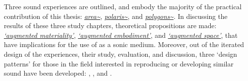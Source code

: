 \begin{SingleSpace}
    Three sound  experiences are outlined, and embody the majority of the practical contribution of this thesis: \textit{\hyperref[sec: area]{area\textasciitilde{}}}, \textit{\hyperref[sec: polaris]{polaris\textasciitilde{}}}, and \textit{\hyperref[sec: polygons]{polygons\textasciitilde{}}}. In discussing the results of these three study chapters, theoretical propositions are made: \textit{\hyperref[sec: discussion-medium-material]{`augmented materiality'}}, \textit{\hyperref[sec: discussion-medium-embodiment]{`augmented embodiment'}}, and \textit{\hyperref[sec: discussion-medium-space]{`augmented space'}}, that have implications for the use of  as a sonic medium. Moreover, out of the iterated design of the  experiences, their study, evaluation, and discussion, three `design patterns' for those in the field interested in reproducing or developing similar sound  have been developed: \textit{\hyperref[sec: discussion-patterns-experience]{}}, \textit{\hyperref[sec: discussion-patterns-instrument]{}}, and \textit{\hyperref[sec: discussion-patterns-environment]{}}.   
\end{SingleSpace}